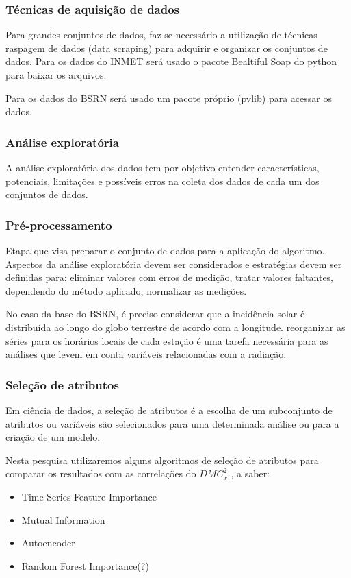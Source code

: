 \documentclass[11pt, aspectratio=169]{beamer}
\newcommand{\dmc}{\(DMC_x^2\) }
\begin{document}
\begin{frame}
  \frametitle{Técnicas de aquisição de dados}

  Para grandes conjuntos de dados, faz-se necessário a utilização de técnicas raspagem de dados (data scraping) para adquirir e organizar os conjuntos de dados. Para os dados do INMET será usado o pacote Bealtiful Soap do python para baixar os arquivos.

  Para os dados do BSRN será usado um pacote próprio (pvlib) para acessar os dados.


\end{frame}

\begin{frame}
  \frametitle{Análise exploratória}

  A análise exploratória dos dados tem por objetivo entender características, potenciais, limitações e possíveis erros na coleta dos dados de cada um dos conjuntos de dados.


\end{frame}

\begin{frame}
  \frametitle{Pré-processamento}

  Etapa que visa preparar o conjunto de dados para a aplicação do algoritmo. Aspectos da análise exploratória devem ser considerados e estratégias devem ser definidas para: eliminar valores com erros de medição, tratar valores faltantes, dependendo do método aplicado, normalizar as medições.

  No caso da base do BSRN, é preciso considerar que a incidência solar é distribuída ao longo do globo terrestre de acordo com a longitude. reorganizar as séries para os horários locais de cada estação é uma tarefa necessária para as análises que levem em conta variáveis relacionadas com a radiação.



\end{frame}

\begin{frame}
  \frametitle{Seleção de atributos}

  Em ciência de dados, a seleção de atributos é a escolha de um subconjunto de atributos ou variáveis são selecionados para uma determinada análise ou para a criação de um modelo.

  Nesta pesquisa utilizaremos alguns algoritmos de seleção de atributos para comparar os resultados com as correlações do \dmc, a saber:

  \begin{itemize}
    \item Time Series Feature Importance
    \item Mutual Information
    \item Autoencoder
    \item Random Forest Importance(?)
  \end{itemize}


\end{frame}
\end{document}
